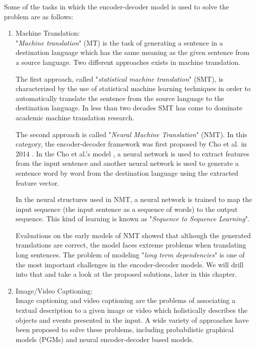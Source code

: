 \documentclass[preprint, 12pt]{elsarticle}
\begin{document}
		Some of the tasks in which the encoder-decoder model is used to solve the problem are as follows:
		\begin{enumerate}
			\item Machine Translation:\\
			"\textit{Machine translation}" (MT) is the task of generating a sentence in a destination language which has the same meaning as the given sentence from a source language. Two different approaches exists in machine translation. 
			
			The first approach, called "\textit{statistical machine translation}" (SMT), is characterized by the use of statistical machine learning techniques in order to automatically translate the sentence from the source language to the destination language. In less than two decades SMT has come to dominate academic machine translation research\cite{lopez2008statistical}. 
			
			The second approach is called "\textit{Neural Machine Translation}" (NMT). In this category, the encoder-decoder framework was first proposed by Cho et al. in 2014 \cite{cho2014learning}. In the Cho et al.'s model \cite{cho2014learning}, a neural network is used to extract features from the input sentence and another neural network is used to generate a sentence word by word from the destination language using the extracted feature vector. 
			
			In the neural structures used in NMT, a neural network is trained to map the input sequence (the input sentence as a sequence of words) to the output sequence. This kind of learning is known as "\textit{Sequence to Sequence Learning}".
			
			 Evaluations on the early models of NMT showed that although the generated translations are correct, the model faces extreme problems when translating long sentences\cite{cho2014properties}. The problem of modeling "\textit{long term dependencies}" is one of the most important challenges in the encoder-decoder models. We will drill into that and take a look at the proposed solutions, later in this chapter.
			
			\item Image/Video Captioning:\\
			Image captioning and video captioning are the problems of associating a textual description to a given image or video which holistically describes the objects and events presented in the input. A wide variety of approaches have been proposed to solve these problems, including probabilistic graphical models (PGMs) and neural encoder-decoder based models.
			

\end{enumerate}
\end{document}
